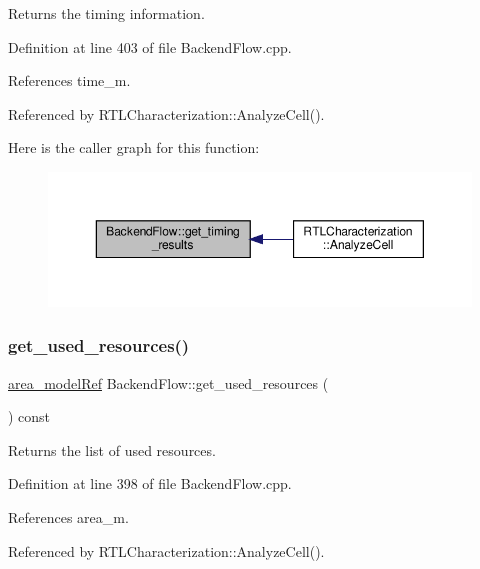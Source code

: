 Returns the timing information. 



Definition at line 403 of file Backend\+Flow.\+cpp.



References time\+\_\+m.



Referenced by R\+T\+L\+Characterization\+::\+Analyze\+Cell().

Here is the caller graph for this function\+:
\nopagebreak
\begin{figure}[H]
\begin{center}
\leavevmode
\includegraphics[width=350pt]{da/d75/classBackendFlow_a92afaf21ef0bea7c282292bc1e05eb68_icgraph}
\end{center}
\end{figure}
\mbox{\label{classBackendFlow_ad80b5e5423a3df382940166a46989f7f}} 
\subsubsection{\texorpdfstring{get\+\_\+used\+\_\+resources()}{get\_used\_resources()}}
{\footnotesize\ttfamily \hyperlink{area__model_8hpp_aec11e4e9b1b3afd49a437cb37df0abfb}{area\+\_\+model\+Ref} Backend\+Flow\+::get\+\_\+used\+\_\+resources (\begin{DoxyParamCaption}{ }\end{DoxyParamCaption}) const}



Returns the list of used resources. 



Definition at line 398 of file Backend\+Flow.\+cpp.



References area\+\_\+m.



Referenced by R\+T\+L\+Characterization\+::\+Analyze\+Cell().

